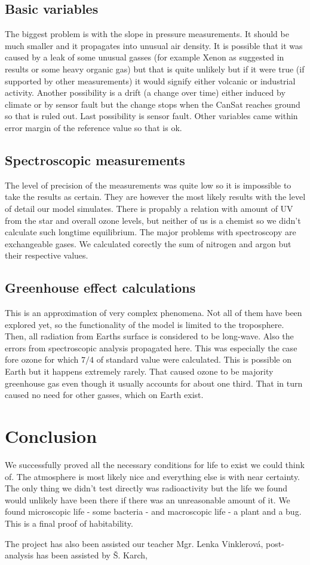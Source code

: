 \documentclass{cfp}
\begin{document}
\subsection{Basic variables}
The biggest problem is with the slope in pressure measurements. It should be much smaller and it propagates into unusual air density. It is possible that it was caused by a leak of some unusual gasses (for example Xenon as suggested in results or some heavy organic gas) but that is quite unlikely but if it were true (if supported by other measurements) it would signify either volcanic or industrial activity. Another possibility is a drift (a change over time) either induced by climate or by sensor fault but the change stops when the CanSat reaches ground so that is ruled out. Last possibility is sensor fault. Other variables came within error margin of the reference value so that is ok.
\subsection{Spectroscopic measurements}
The level of precision of the measurements was quite low so it is impossible to take the results as certain. They are however the most likely results with the level of detail our model simulates. There is propably a relation with amount of UV from the star and overall ozone levels, but neither of us is a chemist so we didn't calculate such longtime equilibrium. The major problems with spectroscopy are exchangeable gases. We calculated corectly the sum of nitrogen and argon but their respective values.
\subsection{Greenhouse effect calculations}
This is an approximation of very complex phenomena. Not all of them have been explored yet, so the functionality of the model is limited to the troposphere. Then, all radiation from Earths surface is considered to be long-wave. Also the errors from spectroscopic analysis propagated here. This was especially the case fore ozone for which $7/4$ of standard value were calculated. This is possible on Earth but it happens extremely rarely. That caused ozone to be majority greenhouse gas even though it usually accounts for about one third. That in turn caused no need for other gasses, which on Earth exist.
\section{Conclusion}
We successfully proved all the necessary conditions for life to exist we could think of. The atmosphere is most likely nice and everything else is with near certainty. The only thing we didn't test directly was radioactivity but the life we found would unlikely have been there if there was an unreasonable amount of it. We found microscopic life - some bacteria - and macroscopic life - a plant and a bug. This is a final proof of habitability.
\begin{acknowledgements}
The project has also been assisted our teacher Mgr. Lenka Vinklerová, post-analysis has been assisted by Š. Karch,
\end{acknowledgements}
\end{document}
